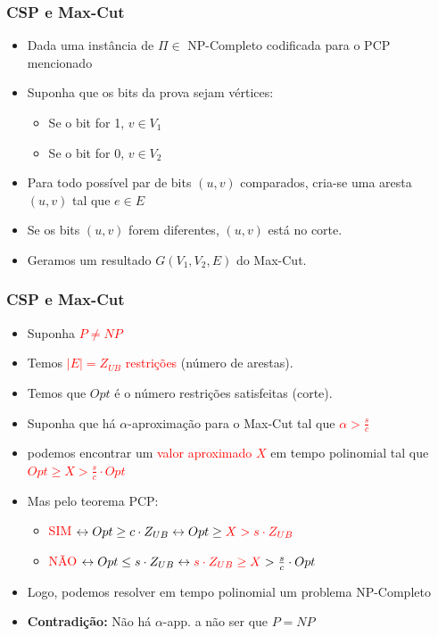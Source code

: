 \documentclass[11pt, handout]{beamer}
\newcommand{\red}[1]{\textcolor{red}{#1}}
\begin{document}
\begin{frame}[<+->]
\frametitle{CSP e Max-Cut}
    \begin{itemize}
        \item Dada uma instância de $\Pi \in$ NP-Completo codificada para o PCP mencionado
        \item Suponha que os bits da prova sejam vértices:
        \begin{itemize}
            \item Se o bit for 1, $v\in V_1$
            \item Se o bit for 0, $v\in V_2$
        \end{itemize}
        \item Para todo possível par de bits $(u,v)$ comparados, cria-se uma aresta $(u,v)$ tal que $e\in E$
        \item Se os bits $(u,v)$ forem diferentes, $(u,v)$ está no corte.
        \item Geramos um resultado $G(V_1,V_2,E)$ do Max-Cut.
    \end{itemize}
\end{frame}{}

\begin{frame}[<+->]
\frametitle{CSP e Max-Cut}
    \begin{itemize}
        \item Suponha \red{$P\ne NP$}
        \item Temos \red{$|E|=Z_{UB}$ restrições} (número de arestas). 
        \item Temos que $Opt$ é o número restrições satisfeitas (corte).
        \item Suponha que há $\alpha$-aproximação para o Max-Cut tal que \red{$\alpha > \frac{s}{c}$}
        \item podemos encontrar um \red{valor aproximado $X$} em tempo polinomial tal que \red{$Opt \geq X > \frac{s}{c} \cdot Opt$}
        \item Mas pelo teorema PCP:
        \begin{itemize}
            \item \textcolor{red}{SIM} $\leftrightarrow Opt \geq c \cdot Z_{UB} \leftrightarrow  Opt \geq \textcolor{red}{X > s \cdot Z_{UB}}$
            \item \textcolor{red}{NÃO} $\leftrightarrow Opt \leq s \cdot Z_{UB} \leftrightarrow \textcolor{red}{s \cdot Z_{UB} \geq X} > \frac{s}{c} \cdot Opt$
        \end{itemize}
        \item Logo, podemos resolver em tempo polinomial um problema NP-Completo
        \item \textbf{Contradição:} Não há $\alpha$-app. a não ser que $P=NP$
    \end{itemize}
\end{frame}{}
\end{document}
